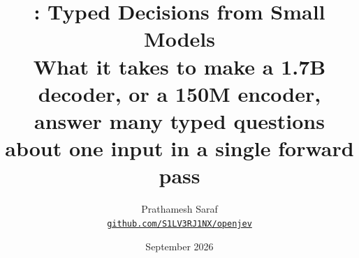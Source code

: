 \documentclass[11pt]{article}
\title{\textbf{\openjev{}: Typed Decisions from Small Models}\\[0.35em]
\large What it takes to make a 1.7B decoder, or a 150M encoder,\\
answer many typed questions about one input in a single forward pass}
\author{%
  Prathamesh Saraf \\
  \texttt{\href{https://github.com/S1LV3RJ1NX/openjev}{github.com/S1LV3RJ1NX/openjev}}
}
\date{September 2026}
\begin{document}
\maketitle

\begin{abstract}

\end{abstract}














\appendix


\end{document}
